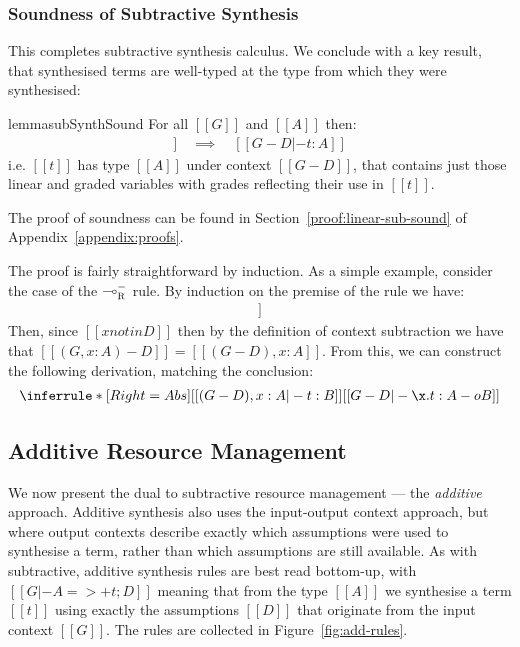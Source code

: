 \subsubsection{Soundness of Subtractive Synthesis}
\label{sec:linear-base-sub-sound}
This completes subtractive synthesis calculus. We conclude
with a key result, that synthesised terms are well-typed at the type from which they
were synthesised:
\label{soundness-ref}
%
\begin{restatable}{lemma}{subSynthSound}
\label{lemma:subSynthSound}
For all $[[ G ]]$ and $[[ A ]]$
then:
\begin{align*}
[[ G |- A =>- t ; D ]] \quad \implies \quad [[ G - D |- t : A ]]
\end{align*}
i.e. $[[ t ]]$ has type $[[ A ]]$
under context $[[ G - D ]]$,
that contains just those linear and
graded variables with grades reflecting their use in $[[ t ]]$.
\end{restatable}
The proof of soundness can be found in Section~\ref{proof:linear-sub-sound} of Appendix~\ref{appendix:proofs}. 

The proof is fairly straightforward by induction. As a simple example, consider the 
case of the $\multimap_\textsc{R}^-$ rule. By induction on the premise of the 
rule we have:
\begin{align*}
  [[ (G, x : A) - D |- t : B ]]
\end{align*}
Then, since $[[x notin D]]$ then by the definition of context
    subtraction we have that $[[ (G, x : A) - D ]] = [[ (G - D), x : A ]]$.
    From this, we can construct the following derivation, matching the
    conclusion:
    \begin{align*}
    \inferrule*[Right=Abs]
    {[[ (G - D) , x : A |- t : B]]}{[[ G - D |- \x. t : A -o B ]]}
    \end{align*}

\subsection{Additive Resource Management}
\label{subsec:additive}
We now present the dual to subtractive resource management --- the
\emph{additive} approach.
Additive synthesis also uses the input-output context approach, but where
output contexts describe exactly which assumptions were used to synthesise
a term, rather than which assumptions are still available. As with subtractive, additive
   synthesis rules are best read bottom-up, with $[[G |- A =>+ t; D]]$
  meaning that from the type $[[A]]$ we synthesise a term $[[t]]$ using
  exactly the assumptions $[[D]]$ that originate from the input
  context $[[G]]$. The rules are collected in Figure~\ref{fig:add-rules}. 

